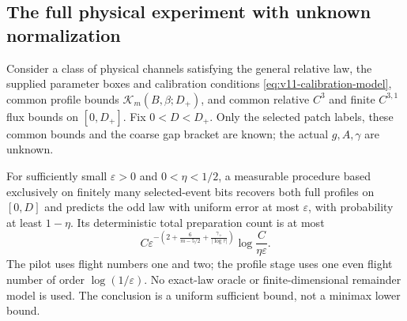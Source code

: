\subsection{The full physical experiment with unknown normalization}
\begin{theorem}
\label{thm:v11-self-calibrated}
Consider a class of physical channels satisfying the general relative
law, the supplied parameter boxes and calibration conditions
\eqref{eq:v11-calibration-model}, common profile bounds
$\mathcal K_m(B,\beta;D_+)$, and common relative $C^3$ and finite
$C^{3,1}$ flux bounds on $[0,D_+]$. Fix $0<D<D_+$. Only the
selected patch labels, these common bounds and the coarse gap bracket
are known; the actual $g,A,\gamma$ are unknown.

For sufficiently small $\varepsilon>0$ and $0<\eta<1/2$, a
measurable procedure based exclusively on finitely many selected-event
bits recovers both full profiles on $[0,D]$ and predicts the odd law
with uniform error at most $\varepsilon$, with probability at least
$1-\eta$. Its deterministic total preparation count is at most
\begin{equation}\label{eq:v11-self-calibrated-budget}
 C\varepsilon^{-\left(2+\frac6{m-5/2}
                       +\frac{\gamma_+}{|\log\tau|}\right)}
                         \log\frac{C}{\eta\varepsilon}.
\end{equation}
The pilot uses flight numbers one and two; the profile stage uses one
even flight number of order $\log(1/\varepsilon)$. No exact-law
oracle or finite-dimensional remainder model is used. The conclusion
is a uniform sufficient bound, not a minimax lower bound.
\end{theorem}
